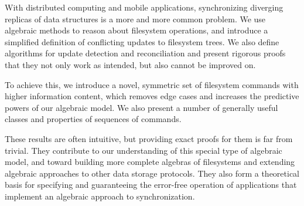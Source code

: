 
With distributed computing and mobile applications,
synchronizing diverging replicas of data structures is a more and more common problem.
We use algebraic methods to reason about filesystem operations, 
and introduce a simplified definition of conflicting updates to filesystem trees.
We also define algorithms for update detection and reconciliation
and present rigorous proofs that they not only work as intended,
but also cannot be improved on.

To achieve this, we introduce a novel, symmetric set of filesystem commands
with higher information content,
which removes edge cases
and increases the predictive powers of our algebraic model.
We also present a number of generally useful classes and properties
of sequences of commands.

These results are often intuitive,
but providing exact proofs for them is far from trivial.
They contribute to our understanding of this special type of algebraic model,
and toward building more complete algebras
of filesystems 
and extending algebraic approaches to other data storage protocols.
They also form a theoretical basis for
specifying
and guaranteeing the error-free operation
of applications that implement an algebraic approach to synchronization.
